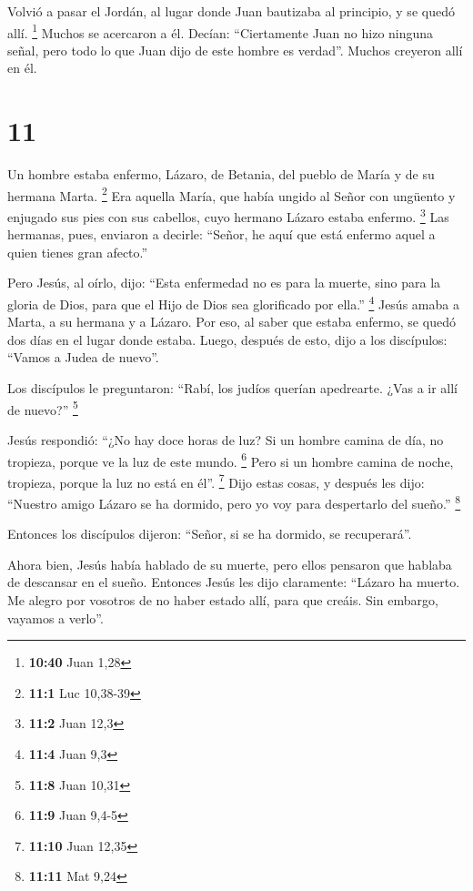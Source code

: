  Volvió a pasar el Jordán, al lugar donde Juan bautizaba
al principio, y se quedó allí. \footnote{\textbf{10:40} Juan 1,28}
 Muchos se acercaron a él. Decían: ``Ciertamente Juan no
hizo ninguna señal, pero todo lo que Juan dijo de este hombre es
verdad''.  Muchos creyeron allí en él.

\hypertarget{section-10}{%
\section{11}\label{section-10}}

 Un hombre estaba enfermo, Lázaro, de Betania, del pueblo
de María y de su hermana Marta. \footnote{\textbf{11:1} Luc 10,38-39}
 Era aquella María, que había ungido al Señor con ungüento
y enjugado sus pies con sus cabellos, cuyo hermano Lázaro estaba
enfermo. \footnote{\textbf{11:2} Juan 12,3}  Las hermanas,
pues, enviaron a decirle: ``Señor, he aquí que está enfermo aquel a
quien tienes gran afecto.''

 Pero Jesús, al oírlo, dijo: ``Esta enfermedad no es para
la muerte, sino para la gloria de Dios, para que el Hijo de Dios sea
glorificado por ella.'' \footnote{\textbf{11:4} Juan 9,3} 
Jesús amaba a Marta, a su hermana y a Lázaro.  Por eso, al
saber que estaba enfermo, se quedó dos días en el lugar donde estaba.
 Luego, después de esto, dijo a los discípulos: ``Vamos a
Judea de nuevo''.

 Los discípulos le preguntaron: ``Rabí, los judíos querían
apedrearte. ¿Vas a ir allí de nuevo?'' \footnote{\textbf{11:8} Juan
  10,31}

 Jesús respondió: ``¿No hay doce horas de luz? Si un
hombre camina de día, no tropieza, porque ve la luz de este mundo.
\footnote{\textbf{11:9} Juan 9,4-5}  Pero si un hombre
camina de noche, tropieza, porque la luz no está en él''. \footnote{\textbf{11:10}
  Juan 12,35}  Dijo estas cosas, y después les dijo:
``Nuestro amigo Lázaro se ha dormido, pero yo voy para despertarlo del
sueño.'' \footnote{\textbf{11:11} Mat 9,24}

 Entonces los discípulos dijeron: ``Señor, si se ha
dormido, se recuperará''.

 Ahora bien, Jesús había hablado de su muerte, pero ellos
pensaron que hablaba de descansar en el sueño.  Entonces
Jesús les dijo claramente: ``Lázaro ha muerto.  Me alegro
por vosotros de no haber estado allí, para que creáis. Sin embargo,
vayamos a verlo''.

